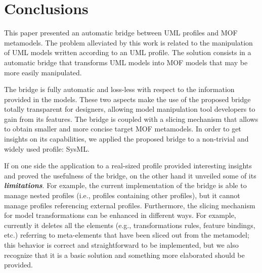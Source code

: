 \section{Conclusions}\label{sec:conclusion}

This paper presented an automatic bridge between UML profiles and MOF metamodels.
The problem alleviated by this work is related to the manipulation of UML models written according to an UML profile. 
The solution consists in a automatic bridge that transforms UML models into MOF models that may be more easily manipulated.

The bridge is fully automatic and
loss-less with respect to the information provided in the models.
These two aspects make the use of the proposed bridge totally transparent for designers, allowing
model manipulation tool developers to gain from its features. The bridge is coupled with a slicing mechanism
that allows to obtain smaller and more concise target MOF metamodels.
In order to get insights on its capabilities, we applied the proposed bridge to a non-trivial and widely used profile:
SysML.

If on one side the application to a real-sized profile provided interesting insights and proved the usefulness of the bridge, on the other hand it unveiled some of its \textbf{\textit{limitations}}.
For example, the current implementation of the bridge is able to manage nested profiles (i.e., profiles containing other profiles), but it
cannot manage profiles referencing external profiles.
Furthermore, the slicing mechanism for model transformations can be enhanced in different ways. For example, currently it deletes all the
elements (e.g., transformations rules, feature bindings, etc.) referring to meta-elements that have been sliced out from the metamodel;
this behavior is correct and straightforward to be implemented, but we also recognize that it is a basic solution
and something more elaborated should be provided.

